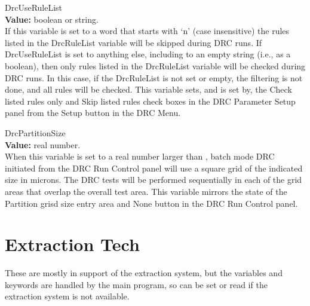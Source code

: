 \begin{description}
\item{\et DrcUseRuleList}\\
{\bf Value:} boolean or string.\\
If this variable is set to a word that starts with `{\vt n}' (case
insensitive) the rules listed in the {\et DrcRuleList} variable will
be skipped during DRC runs.  If {\et DrcUseRuleList} is set to
anything else, including to an empty string (i.e., as a boolean), then
only rules listed in the {\et DrcRuleList} variable will be checked
during DRC runs.  In this case, if the {\et DrcRuleList} is not set or
empty, the filtering is not done, and all rules will be checked.  This
variable sets, and is set by, the {\cb Check listed rules only} and
{\cb Skip listed rules} check boxes in the {\cb DRC Parameter Setup}
panel from the {\cb Setup} button in the {\cb DRC Menu}.

\item{\et DrcPartitionSize}\\
{\bf Value:} real number.\\
When this variable is set to a real number larger than {},
batch mode DRC initiated from the {\cb DRC Run Control} panel will use
a square grid of the indicated size in microns.  The DRC tests will be
performed sequentially in each of the grid areas that overlap the
overall test area.  This variable mirrors the state of the {\cb
Partition grisd size} entry area and {\cb None} button in the {\cb DRC
Run Control} panel.
\end{description}


\section{Extraction Tech}
\label{extech}

These are mostly in support of the extraction system, but the
variables and keywords are handled by the main program, so can be set
or read if the extraction system is not available.

